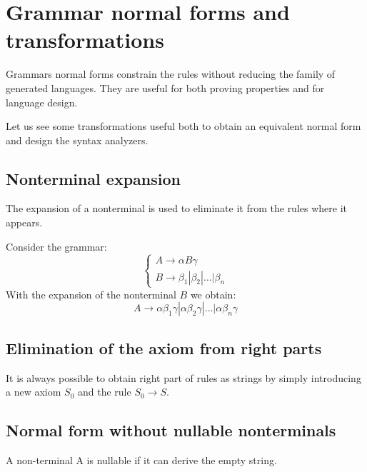 \section{Grammar normal forms and transformations}

Grammars normal forms constrain the rules without reducing the family of generated languages. 
They are useful for both proving properties and for language design. 

Let us see some transformations useful both to obtain an equivalent normal form and design the syntax analyzers.

\subsection*{Nonterminal expansion}
The expansion of a nonterminal is used to eliminate it from the rules where it appears. 
\begin{example}
    Consider the grammar: 
    \[
    \begin{cases}
        A \rightarrow \alpha B \gamma \\
        B \rightarrow \beta_1|\beta_2|\dots|\beta_n
    \end{cases}    
    \]
    With the expansion of the nonterminal $B$ we obtain: 
    \[A \rightarrow \alpha\beta_1\gamma|\alpha\beta_2\gamma|\dots|\alpha\beta_n\gamma\]
\end{example}

\subsection*{Elimination of the axiom from right parts}
It is always possible to obtain right part of rules as strings by simply introducing a new axiom $S_0$ and the rule $S_0 \rightarrow S$.

\subsection*{Normal form without nullable nonterminals}
A non-terminal A is nullable if it can derive the empty string. 

